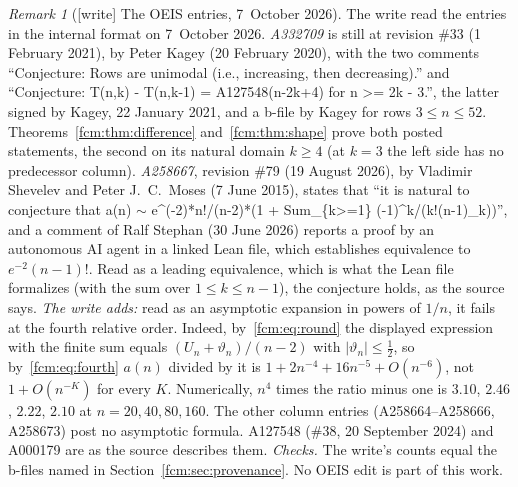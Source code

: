 \documentclass[11pt,letterpaper]{article}
\theoremstyle{remark}\newtheorem{remark}[theorem]{Remark}
\begin{document}
\begin{remark}[{[write]} The OEIS entries, 7~October 2026]\label{fcm:rem:oeis}
The write read the entries in the internal format on 7~October 2026.
\emph{A332709} is still at revision \#33 (1 February 2021), by Peter Kagey (20
February 2020), with the two comments ``Conjecture: Rows are unimodal (i.e.,
increasing, then decreasing).'' and ``Conjecture: T(n,k) - T(n,k-1) =
A127548(n-2k+4) for n >= 2k - 3.'', the latter signed by Kagey, 22 January
2021, and a b-file by Kagey for rows $3\le n\le52$. Theorems~\ref{fcm:thm:difference}
and~\ref{fcm:thm:shape} prove both posted statements, the second on its
natural domain $k\ge4$ (at $k=3$ the left side has no predecessor column).
\emph{A258667}, revision \#79 (19 August 2026), by Vladimir Shevelev and Peter
J.\ C.\ Moses (7 June 2015), states that ``it is natural to conjecture that
a(n) $\sim$ e\^{}(-2)*n!/(n-2)*(1 + Sum\_\{k>=1\} (-1)\^{}k/(k!(n-1)\_k))'', and a
comment of Ralf Stephan (30 June 2026) reports a proof by an autonomous AI agent
in a linked Lean file, which establishes equivalence to $e^{-2}(n-1)!$. Read
as a leading equivalence, which is what the Lean file formalizes (with the sum
over $1\le k\le n-1$), the conjecture holds, as the source says.
\emph{The write adds:} read as an asymptotic expansion in powers of $1/n$, it
fails at the fourth relative order. Indeed, by~\eqref{fcm:eq:round} the
displayed expression with the finite sum equals $(U_n+\vartheta_n)/(n-2)$
with $|\vartheta_n|\le\frac12$, so by~\eqref{fcm:eq:fourth} $a(n)$ divided by
it is $1+2n^{-4}+16n^{-5}+O(n^{-6})$, not $1+O(n^{-K})$ for every $K$.
Numerically, $n^4$ times the ratio minus one is $3.10$, $2.46$, $2.22$, $2.10$ at $n=20,40,80,160$.
The other column entries (A258664--A258666, A258673) post no asymptotic
formula. A127548 (\#38, 20 September 2024) and A000179 are as the source
describes them. \emph{Checks.} The write's counts equal the b-files named in
Section~\ref{fcm:sec:provenance}. No OEIS edit is part of this work.
\end{remark}
\end{document}
